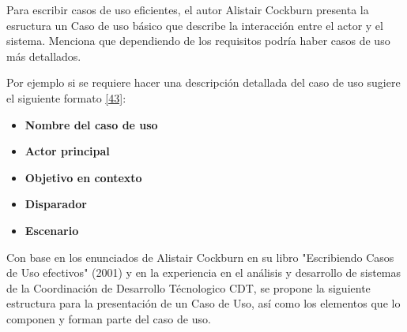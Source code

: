 Para escribir casos de uso eficientes, el autor Alistair Cockburn presenta la esructura un Caso de uso básico que describe la interacción entre el actor y el sistema. Menciona que dependiendo de los requisitos podría haber casos de uso más detallados. 

Por ejemplo si se requiere hacer una descripción detallada del caso de uso sugiere el siguiente formato \hyperlink{b43}{[43]}: 

\begin{itemize}
\item \textbf{Nombre del caso de uso}
\item \textbf{Actor principal}
\item \textbf{Objetivo en contexto} 
\item \textbf{Disparador} 
\item \textbf{Escenario} 
\end{itemize}

Con base en los enunciados de Alistair Cockburn en su libro "Escribiendo Casos de Uso efectivos" (2001) y en la experiencia en el análisis y desarrollo de sistemas de la Coordinación de Desarrollo Técnologico CDT, se propone la siguiente estructura para la presentación de un Caso de Uso, así como los elementos que lo componen y forman parte del caso de uso.

